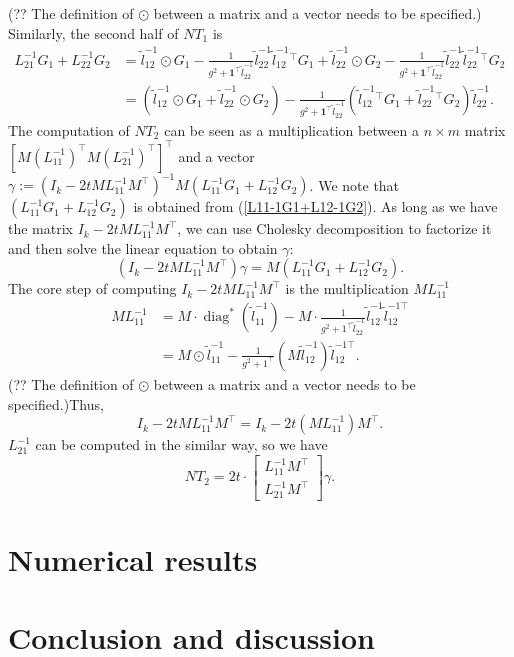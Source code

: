 \documentclass[final,onefignum,onetabnum]{siamart190516}
\begin{document}
(?? The definition of $\odot$ between a matrix and a vector needs to be specified.) Similarly, the second half of $NT_1$ is
\begin{equation}
    \begin{aligned}
            L^{-1}_{21} G_1 + L^{-1}_{22} G_2 &= \widetilde{l}^{-1}_{12} \odot G_1 - \frac{1}{g^2+\mathbf{1}^\top \widetilde{l}^{-1}_{22}}\widetilde{l}^{-1}_{22}\widetilde{l}^{-1}_{12}^\top G_1 + 
            \widetilde{l}^{-1}_{22} \odot G_2 - \frac{1}{g^2+\mathbf{1}^\top \widetilde{l}^{-1}_{22}}\widetilde{l}^{-1}_{22}\widetilde{l}^{-1}_{22}^\top G_2\\
            & = \left(\widetilde{l}^{-1}_{12} \odot G_1 +\widetilde{l}^{-1}_{22} \odot G_2 \right) - \frac{1}{g^2+\mathbf{1}^\top \widetilde{l}^{-1}_{22}}\left(\widetilde{l}^{-1}_{12}^\top G_1 + \widetilde{l}^{-1}_{22}^\top G_2\right)\widetilde{l}^{-1}_{22}.
    \end{aligned}
\end{equation}
The computation of $NT_2$ can be seen as a multiplication between a $n\times m$ matrix $[M(L_{11}^{-1})^{\top} M(L_{21}^{-1})^{\top}]^{\top}$ and a vector $\gamma := \left(I_k-2t M L^{-1}_{11} M^\top\right)^{-1}M\left(L^{-1}_{11} G_1 + L^{-1}_{12} G_2\right)$. We note that $\left(L^{-1}_{11} G_1 + L^{-1}_{12} G_2\right)$ is obtained from (\ref{L11-1G1+L12-1G2}). As long as we have the matrix $I_k-2t M L^{-1}_{11} M^\top$, we can use Cholesky decomposition to factorize it and then solve the linear equation to obtain $\gamma$:
\begin{equation}
    \left(I_k-2t M L^{-1}_{11} M^\top\right)\gamma = M\left(L^{-1}_{11} G_1 + L^{-1}_{12} G_2\right).
\end{equation}
The core step of computing $I_k-2t M L^{-1}_{11} M^\top$ is the multiplication $M L^{-1}_{11}$
\begin{equation}
    \begin{aligned}
             M L^{-1}_{11} &= M\cdot \operatorname{diag}^{*}\left(\widetilde{l}_{11}^{-1}\right)-M\cdot\frac{1}{g^{2}+1^{\top} \widetilde{l}_{22}^{-1}} \widetilde{l}_{12}^{-1} \widetilde{l}_{12}^{-1 \top}   \\
    &= M\odot \widetilde{l}_{11}^{-1} - \frac{1}{g^{2}+1^{\top}} \left(M\widetilde{l}_{12}^{-1}\right)\widetilde{l}_{12}^{-1 \top}.
    \end{aligned}
\end{equation}
(?? The definition of $\odot$ between a matrix and a vector needs to be specified.)Thus,
\begin{equation}
 I_k-2t M L^{-1}_{11} M^\top = I_k-2t \left(M L^{-1}_{11}\right) M^\top.  \end{equation}
 $L_{21}^{-1}$ can be computed in the similar way, so we have
 \begin{equation}
      NT_2 = 2t\cdot \begin{bmatrix} L^{-1}_{11}M^\top\\L^{-1}_{21}M^\top  \end{bmatrix} \gamma.
 \end{equation}

\section{Numerical results}

\section{Conclusion and discussion}




\end{document}
